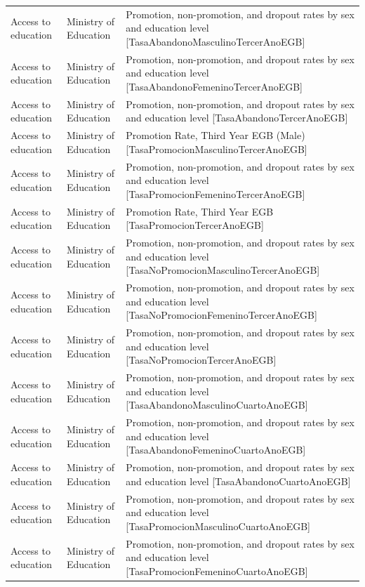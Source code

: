 \documentclass[10pt,a4paper]{article}
\begin{document}
\begin{longtable}{@{}>{\raggedright\arraybackslash}p{3.5cm}>{\raggedright\arraybackslash}p{5.6cm}>{\raggedright\arraybackslash}p{\dimexpr\textwidth-9.1cm-4\tabcolsep\relax}@{}}
Access to education & Ministry of Education & Promotion, non-promotion, and dropout rates by sex and education level [TasaAbandonoMasculinoTercerAnoEGB]\\
Access to education & Ministry of Education & Promotion, non-promotion, and dropout rates by sex and education level [TasaAbandonoFemeninoTercerAnoEGB]\\
Access to education & Ministry of Education & Promotion, non-promotion, and dropout rates by sex and education level [TasaAbandonoTercerAnoEGB]\\
Access to education & Ministry of Education & Promotion Rate, Third Year EGB (Male) [TasaPromocionMasculinoTercerAnoEGB]\\
Access to education & Ministry of Education & Promotion, non-promotion, and dropout rates by sex and education level [TasaPromocionFemeninoTercerAnoEGB]\\
Access to education & Ministry of Education & Promotion Rate, Third Year EGB [TasaPromocionTercerAnoEGB]\\
Access to education & Ministry of Education & Promotion, non-promotion, and dropout rates by sex and education level [TasaNoPromocionMasculinoTercerAnoEGB]\\
Access to education & Ministry of Education & Promotion, non-promotion, and dropout rates by sex and education level [TasaNoPromocionFemeninoTercerAnoEGB]\\
Access to education & Ministry of Education & Promotion, non-promotion, and dropout rates by sex and education level [TasaNoPromocionTercerAnoEGB]\\
Access to education & Ministry of Education & Promotion, non-promotion, and dropout rates by sex and education level [TasaAbandonoMasculinoCuartoAnoEGB]\\
Access to education & Ministry of Education & Promotion, non-promotion, and dropout rates by sex and education level [TasaAbandonoFemeninoCuartoAnoEGB]\\
Access to education & Ministry of Education & Promotion, non-promotion, and dropout rates by sex and education level [TasaAbandonoCuartoAnoEGB]\\
Access to education & Ministry of Education & Promotion, non-promotion, and dropout rates by sex and education level [TasaPromocionMasculinoCuartoAnoEGB]\\
Access to education & Ministry of Education & Promotion, non-promotion, and dropout rates by sex and education level [TasaPromocionFemeninoCuartoAnoEGB]\\

\end{longtable}
\end{document}

